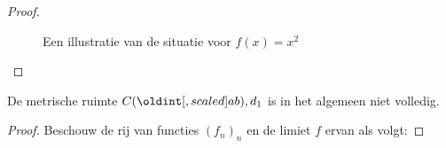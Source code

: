 \documentclass[main.tex]{subfiles}
\begin{document}
\begin{vb}
\begin{proof}
\begin{itemize}
\begin{figure}[H]
      \caption{ Een illustratie van de situatie voor $f(x) = x^{2}$}
    \end{figure}
    \end{itemize}
  \end{proof}
\end{vb}

\begin{vb}
  De metrische ruimte $C(\interval{a}{b}),d_{1}$ is in het algemeen niet volledig.

  \begin{proof}
    Beschouw de rij van functies $(f_{n})_{n}$ en de limiet $f$ ervan als volgt:


\end{proof}
\end{vb}
\end{document}
